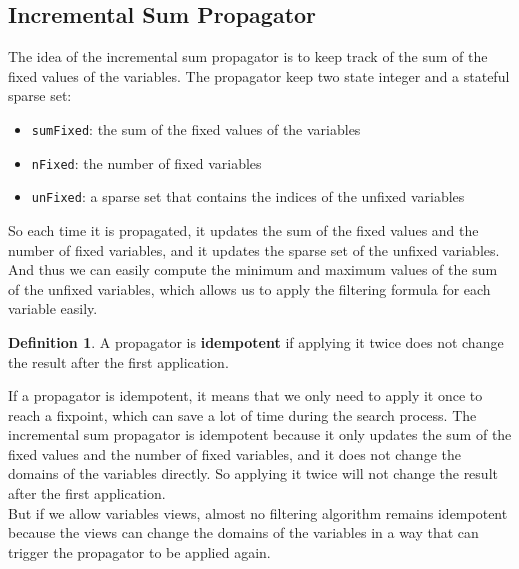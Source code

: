 \documentclass[12pt, openany]{report}
\theoremstyle{definition}
\newtheorem{definition}[thm]{Definition}
\begin{document}
\subsection{Incremental Sum Propagator}
The idea of the incremental sum propagator is to keep track of the sum of the fixed values of the variables. The propagator keep two state integer and a stateful sparse set:
\begin{itemize}
    \item \texttt{sumFixed}: the sum of the fixed values of the variables
    \item \texttt{nFixed}: the number of fixed variables
    \item \texttt{unFixed}: a sparse set that contains the indices of the unfixed variables
\end{itemize}
So each time it is propagated, it updates the sum of the fixed values and the number of fixed variables, and it updates the sparse set of the unfixed variables. And thus we can easily compute the minimum and maximum values of the sum of the unfixed variables, which allows us to apply the filtering formula for each variable easily.
\begin{definition}
    A propagator is \textbf{idempotent} if applying it twice does not change the result after the first application. 
\end{definition}
If a propagator is idempotent, it means that we only need to apply it once to reach a fixpoint, which can save a lot of time during the search process. The incremental sum propagator is idempotent because it only updates the sum of the fixed values and the number of fixed variables, and it does not change the domains of the variables directly. So applying it twice will not change the result after the first application.\\
But if we allow variables views, almost no filtering algorithm remains idempotent because the views can change the domains of the variables in a way that can trigger the propagator to be applied again. 
\end{document}

